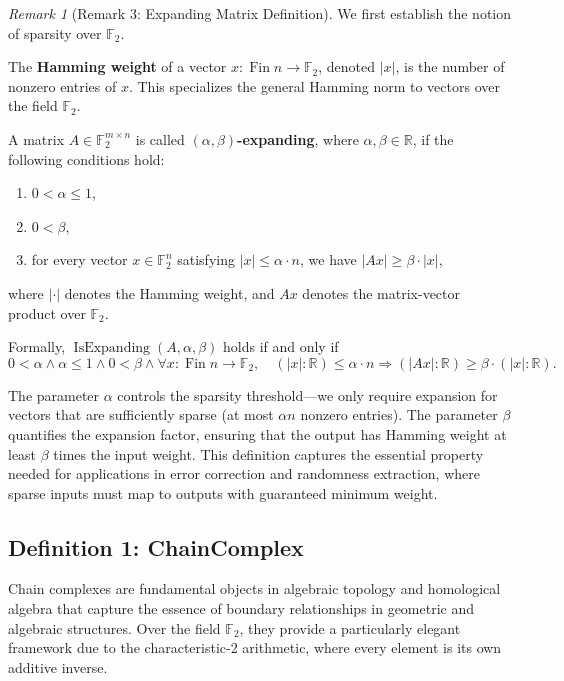 \documentclass[11pt]{article}
\theoremstyle{plain}
\theoremstyle{definition}
\theoremstyle{remark}
\newtheorem*{remark}{Remark}
\begin{document}
\begin{remark}[Remark 3: Expanding Matrix Definition]
We first establish the notion of sparsity over $\mathbb{F}_2$.

The \textbf{Hamming weight} of a vector $x : \operatorname{Fin} n \to \mathbb{F}_2$, denoted $|x|$, is the number of nonzero entries of $x$. This specializes the general Hamming norm to vectors over the field $\mathbb{F}_2$.

A matrix $A \in \mathbb{F}_2^{m \times n}$ is called \textbf{$(\alpha, \beta)$-expanding}, where $\alpha, \beta \in \mathbb{R}$, if the following conditions hold:
\begin{enumerate}
  \item $0 < \alpha \leq 1$,
  \item $0 < \beta$,
  \item for every vector $x \in \mathbb{F}_2^n$ satisfying $|x| \leq \alpha \cdot n$, we have $|Ax| \geq \beta \cdot |x|$,
\end{enumerate}
where $|\cdot|$ denotes the Hamming weight, and $Ax$ denotes the matrix-vector product over $\mathbb{F}_2$.

Formally, $\operatorname{IsExpanding}(A, \alpha, \beta)$ holds if and only if
\[
  0 < \alpha \land \alpha \leq 1 \land 0 < \beta \land \forall x : \operatorname{Fin} n \to \mathbb{F}_2, \quad (|x| : \mathbb{R}) \leq \alpha \cdot n \Rightarrow (|Ax| : \mathbb{R}) \geq \beta \cdot (|x| : \mathbb{R}).
\]
\end{remark}

The parameter $\alpha$ controls the sparsity threshold—we only require expansion for vectors that are sufficiently sparse (at most $\alpha n$ nonzero entries). The parameter $\beta$ quantifies the expansion factor, ensuring that the output has Hamming weight at least $\beta$ times the input weight. This definition captures the essential property needed for applications in error correction and randomness extraction, where sparse inputs must map to outputs with guaranteed minimum weight.

\vspace{1em}

\subsection{Definition 1: ChainComplex}

Chain complexes are fundamental objects in algebraic topology and homological algebra that capture the essence of boundary relationships in geometric and algebraic structures. Over the field $\mathbb{F}_2$, they provide a particularly elegant framework due to the characteristic-2 arithmetic, where every element is its own additive inverse.
\end{document}
